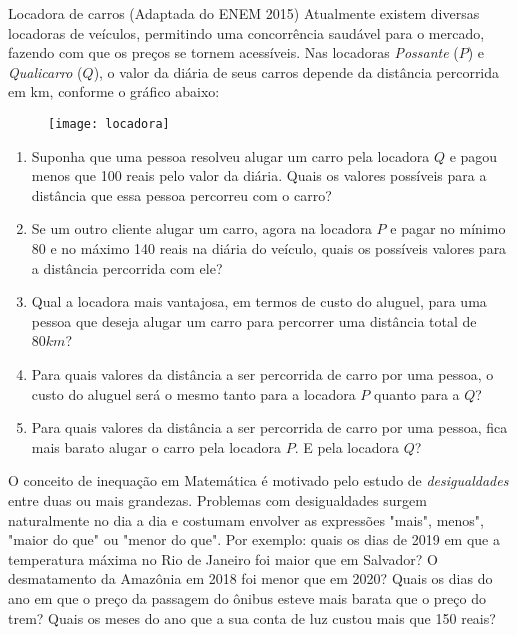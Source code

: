 \begin{task}{Locadora de carros (Adaptada do ENEM 2015)}
\label{locadora}
Atualmente existem diversas locadoras de veículos, permitindo uma concorrência saudável para o mercado, fazendo com que os preços se tornem acessíveis. Nas locadoras \emph{Possante} ($P$) e \emph{Qualicarro} ($Q$), o valor da diária de seus carros depende da distância percorrida em km, conforme o gráfico abaixo:

\begin{figure}[H]
\centering
\noindent\texttt{[image: locadora]}
\end{figure}


\begin{enumerate}

\item{}
Suponha que uma pessoa resolveu alugar um carro pela locadora $Q$ e pagou menos que 100 reais pelo valor da diária. Quais os valores possíveis para a distância que essa pessoa percorreu com o carro?

\item{}
Se um outro cliente alugar um carro, agora na locadora $P$ e pagar no mínimo 80 e no máximo 140 reais na diária do veículo, quais os possíveis valores para a distância percorrida com ele?

\item{}
Qual a locadora mais vantajosa, em termos de custo do aluguel, para uma pessoa que deseja alugar um carro para percorrer uma distância total de $80 km$?

\item{} Para quais valores da distância a ser percorrida de carro por uma pessoa, o custo do aluguel será o mesmo tanto para a locadora $P$ quanto para a $Q$?

\item{} Para quais valores da distância a ser percorrida de carro por uma pessoa, fica mais barato alugar o carro pela locadora $P$. E pela locadora $Q$? 

\end{enumerate}
\end{task}



\label{\detokenize{AF107-6:inequacoes}}\label{\detokenize{AF107-6::doc}}

O conceito de inequação em Matemática é motivado pelo estudo de \emph{desigualdades} entre duas ou mais grandezas. Problemas com desigualdades surgem naturalmente no dia a dia e costumam envolver as expressões "mais", menos", "maior do que"{} ou "menor do que". Por exemplo: quais os dias de 2019 em que a temperatura máxima no Rio de Janeiro foi maior que em Salvador? O desmatamento da Amazônia em 2018 foi menor que em 2020? Quais os dias do ano em que o preço da passagem do ônibus esteve mais barata que o preço do trem? Quais os meses do ano que a sua conta de luz custou mais que 150 reais? 

